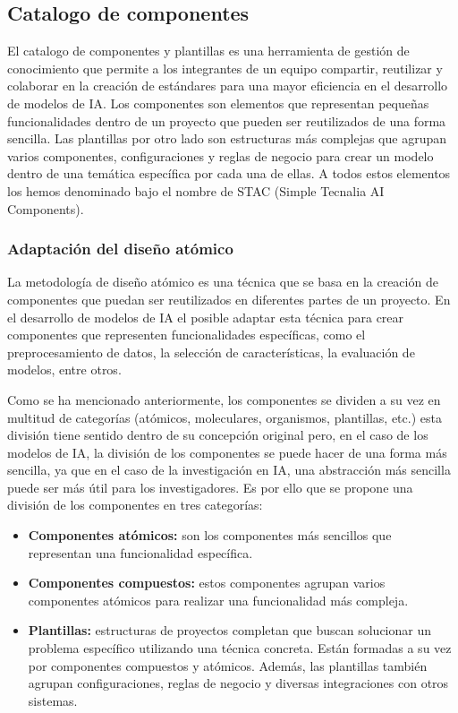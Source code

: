 \subsection{Catalogo de componentes}
El catalogo de componentes y plantillas es una herramienta de gestión
de conocimiento que permite a los integrantes de un equipo compartir,
reutilizar y colaborar en la creación de estándares para una mayor
eficiencia en el desarrollo de modelos de IA. Los componentes son
elementos que representan pequeñas funcionalidades dentro de un
proyecto que pueden ser reutilizados de una forma sencilla. Las plantillas 
por otro lado son estructuras más complejas que agrupan varios componentes, 
configuraciones y reglas de negocio para crear un modelo dentro de una 
temática específica por cada una de ellas. A todos estos elementos los hemos
denominado bajo el nombre de STAC (Simple Tecnalia AI Components).\medskip

\subsubsection{Adaptación del diseño atómico}
La metodología de diseño atómico es una técnica que se basa en la
creación de componentes que puedan ser reutilizados en diferentes partes
de un proyecto. En el desarrollo de modelos de IA el posible adaptar
esta técnica para crear componentes que representen funcionalidades
específicas, como el preprocesamiento de datos, la selección de
características, la evaluación de modelos, entre otros.\medskip

Como se ha mencionado anteriormente, los componentes se dividen
a su vez en multitud de categorías (atómicos, moleculares, organismos, plantillas, etc.)
esta división tiene sentido dentro de su concepción original pero,
en el caso de los modelos de IA, la división de los componentes se puede hacer
de una forma más sencilla, ya que en el caso de la investigación en IA, una
abstracción más sencilla puede ser más útil para los investigadores. Es por
ello que se propone una división de los componentes en tres categorías:

\begin{itemize}
    \item \textbf{Componentes atómicos:} son los componentes más sencillos
    que representan una funcionalidad específica.
    \item \textbf{Componentes compuestos:} estos componentes agrupan
    varios componentes atómicos para realizar una funcionalidad más
    compleja.
    \item \textbf{Plantillas:} estructuras de proyectos completan que buscan
    solucionar un problema específico utilizando una técnica concreta. Están
    formadas a su vez por componentes compuestos y atómicos. Además, las
    plantillas también agrupan configuraciones, reglas de negocio y
    diversas integraciones con otros sistemas.
\end{itemize}

